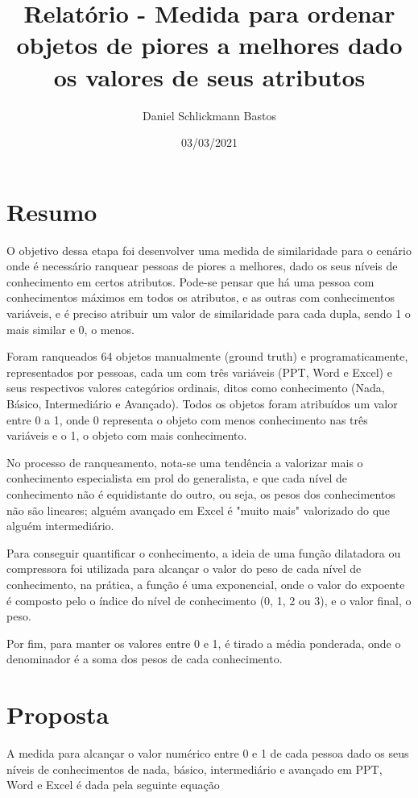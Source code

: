 \documentclass[]{article}
\title{Relatório - Medida para ordenar objetos de piores a melhores dado os valores de seus atributos}
\author[1]{Daniel Schlickmann Bastos}
\date{03/03/2021}
\begin{document}
		
	\maketitle
	
	\section{Resumo}
		O objetivo dessa etapa foi desenvolver uma medida de similaridade para o cenário onde é necessário ranquear pessoas de piores a melhores, dado os seus níveis de conhecimento em certos atributos. Pode-se pensar que há uma pessoa com conhecimentos máximos em todos os atributos, e as outras com conhecimentos variáveis, e é preciso atribuir um valor de similaridade para cada dupla, sendo 1 o mais similar e 0, o menos.
		
		Foram ranqueados 64 objetos manualmente (ground truth) e programaticamente, representados por pessoas, cada um com três variáveis (PPT, Word e Excel) e seus respectivos valores categórios ordinais, ditos como conhecimento (Nada, Básico, Intermediário e Avançado). Todos os objetos foram atribuídos um valor entre 0 a 1, onde 0 representa o objeto com menos conhecimento nas três variáveis e o 1, o objeto com mais conhecimento.
		
		No processo de ranqueamento, nota-se uma tendência a valorizar mais o conhecimento especialista em prol do generalista, e que cada nível de conhecimento não é equidistante do outro, ou seja, os pesos dos conhecimentos não são lineares; alguém avançado em Excel é "muito mais" valorizado do que alguém intermediário.
		
		Para conseguir quantificar o conhecimento, a ideia de uma função dilatadora ou compressora foi utilizada para alcançar o valor do peso de cada nível de conhecimento, na prática, a função é uma exponencial, onde o valor do expoente é composto pelo o índice do nível de conhecimento (0, 1, 2 ou 3), e o valor final, o peso.
		
		Por fim, para manter os valores entre 0 e 1, é tirado a média ponderada, onde o denominador é a soma dos pesos de cada conhecimento.
	\section{Proposta}
		A medida para alcançar o valor numérico entre 0 e 1 de cada pessoa dado os seus níveis de conhecimentos de nada, básico, intermediário e avançado em PPT, Word e Excel é dada pela seguinte equação
		
\end{document}
